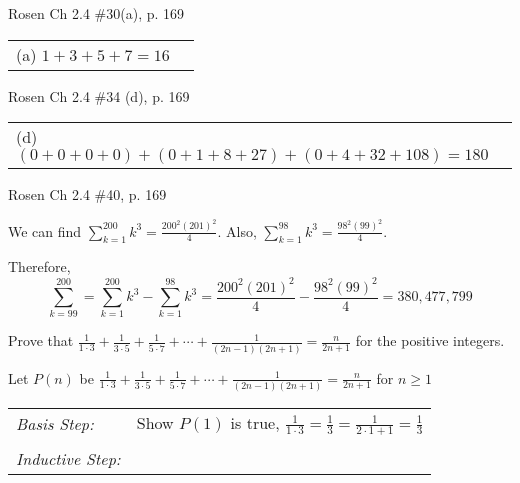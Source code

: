 \documentclass[12pt,addpoints]{exam}
\newcommand{\ds}{\displaystyle}
\begin{document}
\begin{questions}
\question[2] Rosen Ch 2.4 \#30(a), p. 169
    \ifprintanswers
        \vspace{-10pt}
   \fi
\begin{solution}
\begin{tabular}{ll}
 (a) $1 + 3 + 5 + 7 = 16$ \hspace{0.5in} & %
\end{tabular} 
\end{solution}


\question[2] Rosen Ch 2.4 \#34 (d), p. 169
    \ifprintanswers
        \vspace{-10pt}
   \fi
\begin{solution}
\begin{tabular}{l}
 (d) $(0+0+0+0)+(0+1+8+27)+(0+4+32+108) = 180$
\end{tabular}
\end{solution}


\question[4] Rosen Ch 2.4 \#40, p. 169
    \ifprintanswers
        \vspace{-10pt}
   \fi
\begin{solution}
 We can find $\ds \sum_{k=1}^{200} k^3 = \frac{200^2(201)^2}{4}$.
 Also, $\ds \sum_{k=1}^{98} k^3 = \frac{98^2(99)^2}{4}$.

 Therefore,
$$ \sum_{k=99}^{200} = \sum_{k=1}^{200} k^3 - \sum_{k=1}^{98} k^3
   = \frac{200^2(201)^2}{4} - \frac{98^2(99)^2}{4} 
   = 380,477,799 $$
\end{solution}



\question[9] Prove that $\ds \frac{1}{1\cdot 3} + \frac{1}{3\cdot 5} + \frac{1}{5\cdot 7} + \cdots + \frac{1}{(2n-1)(2n+1)} = \frac{n}{2n+1}$ for the positive integers.
    \ifprintanswers
        \vspace{-10pt}
   \fi
\begin{solution}
Let $P(n)$ be $\frac{1}{1\cdot 3} + \frac{1}{3\cdot 5} + \frac{1}{5\cdot 7} + \cdots + \frac{1}{(2n-1)(2n+1)} = \frac{n}{2n+1}$ for $n \geq 1$

\smallskip
\begin{tabular}{lp{4in}}
  \textit{Basis Step:} & Show $P(1)$ is true, $\frac{1}{1\cdot 3}= \frac{1}{3} = \frac{1}{2\cdot1 +1} = \frac{1}{3}$ \\
   & \\
 \textit{Inductive Step:} &  \\
\end{tabular}


\end{solution}
\end{questions}
\end{document}
